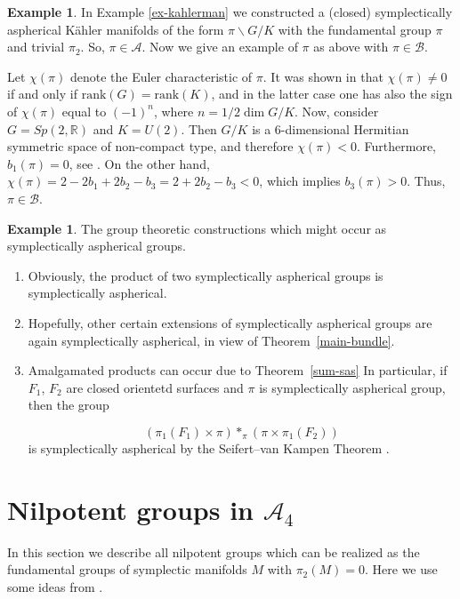 \documentclass[12pt, twoside]{amsart}
\theoremstyle{plain}
\theoremstyle{definition}
\newtheorem{example}[theorem]{Example}
\numberwithin{equation}{section}
\def\RR{\mathbb R}
\def\dim{\operatorname {dim}}
\def\AAA{{\mathcal A}}
\def\BBB{{\mathcal B}}
\def\RR{\mathbb R}
\begin{document}
\begin{example} In Example \ref{ex-kahlerman} we constructed a (closed) 
symplectically aspherical K\"ahler manifolds of the form $\pi\backslash G/K$ 
with the fundamental group $\pi$ and trivial $\pi_2$. So, $\pi\in \AAA$. Now we 
give an example of $\pi$ as above  with $\pi \in \BBB$.

Let $\chi(\pi)$ denote the Euler characteristic of $\pi$. It was shown in
\cite[Theorem 7.9]{VGS} that $\chi(\pi)\not=0$ if and only if
$\text{rank}(G)=\text{rank}(K)$, and in the latter case one has also the sign
of $\chi(\pi)$  equal to $(-1)^n$, where $n= {1/2}\dim G/K$. Now,
consider $G=Sp(2,\RR)$ and $K=U(2)$.  Then $G/K$ is a 6-dimensional Hermitian
symmetric space of non-compact type, and therefore $\chi(\pi)<0$.
Furthermore, $b_1(\pi)=0$, see \cite[Theorem 7.1]{VGS}. On the other hand,
$\chi(\pi)=2-2b_1+ 2b_2-b_3=2+2b_2-b_3<0$, which implies $b_3(\pi)>0$.
Thus, $\pi \in \BBB$.
\end{example} 

\begin{example}
The group theoretic constructions which might occur as
symplectically aspherical groups.
\begin{enumerate}
\item
Obviously, the product of two symplectically aspherical
groups is symplectically aspherical.
\item
Hopefully, other certain extensions
of symplectically aspherical groups are again symplectically
aspherical, in view of Theorem~\ref{main-bundle}.
\item
Amalgamated products can occur due to Theorem~\ref{sum-sas}
In particular, if $F_1$, $F_2$ are closed orientetd
surfaces and $\pi $ is symplectically aspherical group,
then the group

$$
\left (\pi_1(F_1)\times \pi \right ) *_{\pi }
\left (\pi \times \pi_1(F_2)\right )
$$
\noindent
is symplectically aspherical by the Seifert--van Kampen Theorem .
\end{enumerate}
\end{example}

\section{Nilpotent groups in $\AAA_4$} 

In this section we describe all nilpotent groups which can be realized as the 
fundamental groups of symplectic manifolds $M$ with $\pi_2(M)=0$. Here we use 
some ideas from \cite{R1}.
\end{document}
